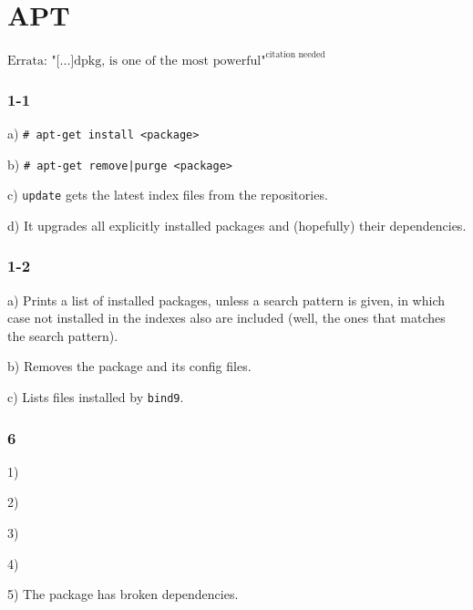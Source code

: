 \chapter{APT}
$\text{Errata: "[...]dpkg, is one of the most powerful"}^{\text{citation needed}}$
\subsection{1-1}
a) \verb=# apt-get install <package>=

b) \verb=# apt-get remove|purge <package>=

c) \verb=update= gets the latest index files from the repositories.

d) It upgrades all explicitly installed packages and (hopefully) their dependencies.

\subsection{1-2}
a) Prints a list of installed packages, unless a search pattern is given, in which case not installed in the indexes also are included (well, the ones that matches the search pattern).

b) Removes the package and its config files.

c) Lists files installed by \verb=bind9=.


%



\subsection{6}
1)

2)

3)

4)

5) The package has broken dependencies.
